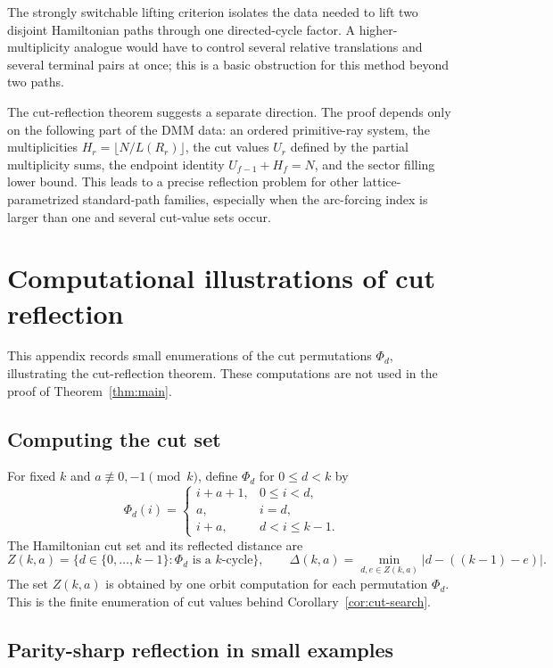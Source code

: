 \documentclass[11pt]{article}
\begin{document}
The strongly switchable lifting criterion isolates the data needed to lift two disjoint Hamiltonian paths through one directed-cycle factor.  A higher-multiplicity analogue would have to control several relative translations and several terminal pairs at once; this is a basic obstruction for this method beyond two paths.

The cut-reflection theorem suggests a separate direction.  The proof depends only on the following part of the DMM data: an ordered primitive-ray system, the multiplicities $H_r=\lfloor N/L(R_r)\rfloor$, the cut values $U_r$ defined by the partial multiplicity sums, the endpoint identity $U_{f-1}+H_f=N$, and the sector filling lower bound.  This leads to a precise reflection problem for other lattice-parametrized standard-path families, especially when the arc-forcing index is larger than one and several cut-value sets occur.

\appendix
\section{Computational illustrations of cut reflection}\label{app:computations}

This appendix records small enumerations of the cut permutations $\Phi_d$, illustrating the cut-reflection theorem.  These computations are not used in the proof of Theorem~\ref{thm:main}.

\subsection{Computing the cut set}

For fixed $k$ and $a\not\equiv0,-1\pmod{k}$, define $\Phi_d$ for $0\le d<k$ by
\[
\Phi_d(i)=
\begin{cases}
 i+a+1,&0\le i<d,\\
 a,&i=d,\\
 i+a,&d<i\le k-1.
\end{cases}
\]
The Hamiltonian cut set and its reflected distance are
\[
        Z(k,a)=\{d\in\{0,\ldots,k-1\}:\Phi_d\text{ is a }k\text{-cycle}\},
        \qquad
        \Delta(k,a)=\min_{d,e\in Z(k,a)} |d-((k-1)-e)|.
\]
The set $Z(k,a)$ is obtained by one orbit computation for each permutation $\Phi_d$.  This is the finite enumeration of cut values behind Corollary~\ref{cor:cut-search}.

\subsection{Parity-sharp reflection in small examples}
\end{document}
